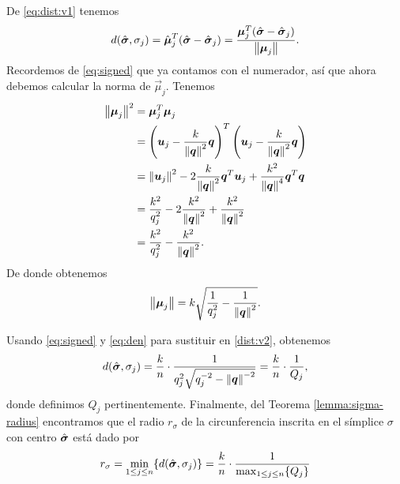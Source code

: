 De \eqref{eq:dist:v1} tenemos
\begin{equation}
	\label{dist:v2}
	d(\hat{\boldsymbol{ \sigma }}, \sigma_j) = \hat{\boldsymbol{\mu}}_j^T(\hat{\boldsymbol{ \sigma }} - \hat{\boldsymbol{ \sigma }}_j)
	= \frac{\boldsymbol{\mu}_j^T(\hat{\boldsymbol{ \sigma }} - \hat{\boldsymbol{ \sigma }}_j)}{\left\lVert \boldsymbol{\mu}_j \right\rVert}.
\end{equation}
Recordemos de \eqref{eq:signed} que ya contamos con el numerador, así que ahora debemos calcular la
norma de $\vec{\mu}_j$. Tenemos
\begin{align*}
	\left\lVert \boldsymbol{\mu}_j \right\rVert^2
	&= \boldsymbol{\mu}_j^T\boldsymbol{\mu}_j \\
	&=
	\left(\boldsymbol{u}_j - \frac{k}{\left\lVert \boldsymbol{q} \right\rVert^2}\boldsymbol{q}\right)^T
	\left(\boldsymbol{u}_j - \frac{k}{\left\lVert \boldsymbol{q} \right\rVert^2}\boldsymbol{q}\right) \\
	&=
	\left\lVert \boldsymbol{u}_j \right\rVert^2 - 2\frac{k}{\left\lVert \boldsymbol{q} \right\rVert^2}\boldsymbol{q}^T\boldsymbol{u}_j +
	\frac{k^2}{\left\lVert \boldsymbol{q} \right\rVert^4}\boldsymbol{q}^T\boldsymbol{q} \\
	&= \frac{k^2}{q_j^2} - 2\frac{k^2}{\left\lVert \boldsymbol{q} \right\rVert^2} + \frac{k^2}{\left\lVert \boldsymbol{q} \right\rVert^2} \\
	&= \frac{k^2}{q_j^2} - \frac{k^2}{\left\lVert \boldsymbol{q} \right\rVert^2}.
\end{align*}
De donde obtenemos
\begin{equation}
	\label{eq:den}
	\left\lVert \boldsymbol{\mu}_j \right\rVert = k\sqrt{\frac{1}{q_j^2} - \frac{1}{\left\lVert \boldsymbol{q} \right\rVert^2}}.
\end{equation}

Usando \eqref{eq:signed} y \eqref{eq:den} para sustituir en \eqref{dist:v2}, obtenemos
\begin{equation*}
	d(\hat{\boldsymbol{ \sigma }}, \sigma_j) = \frac{k}{n} \cdot
	\frac{1}{q_j^2\sqrt{q_j^{-2} - \left\lVert \boldsymbol{q} \right\rVert^{-2}}}
	= \frac{k}{n} \cdot \frac{1}{Q_j},
\end{equation*}
donde definimos $Q_j$ pertinentemente. Finalmente, del Teorema \ref{lemma:sigma-radius} encontramos que
el radio $r_\sigma$ de la circunferencia inscrita en el símplice $\sigma$ con centro
$\hat{\boldsymbol{ \sigma }}$ está dado por
\begin{equation}
	\label{eq:sigma-radius}
	r_\sigma = \min_{1 \leq j \leq n} \lbrace d(\hat{\boldsymbol{ \sigma }}, \sigma_j) \rbrace = \frac{k}{n} \cdot
	\frac{1}{\max_{1 \leq j \leq n} \lbrace Q_j \rbrace}
\end{equation}

